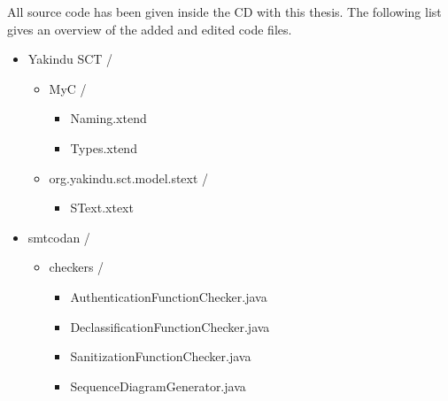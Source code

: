 All source code has been given inside the CD with this thesis. The following list gives an overview of the added and edited code files.
\begin{itemize}
	\item Yakindu SCT /
	       \begin{itemize}
	       	 \item MyC /
		       	  \begin{itemize}
		       	  	\item Naming.xtend
		       	  	\item Types.xtend
		       	  \end{itemize}
			    \item org.yakindu.sct.model.stext /	 \begin{itemize}
			      	\item SText.xtext
			     \end{itemize}      	  	
	       \end{itemize}
	  \item smtcodan /
	       \begin{itemize}
	       	\item checkers /
	       	   \begin{itemize}
	       	   	\item AuthenticationFunctionChecker.java
	       	   	\item DeclassificationFunctionChecker.java
	       	   	\item SanitizationFunctionChecker.java
	       	   	
	       	   	\item SequenceDiagramGenerator.java 	   	     		
	       	   \end{itemize}  
	       \end{itemize} 
	       	
\end{itemize}